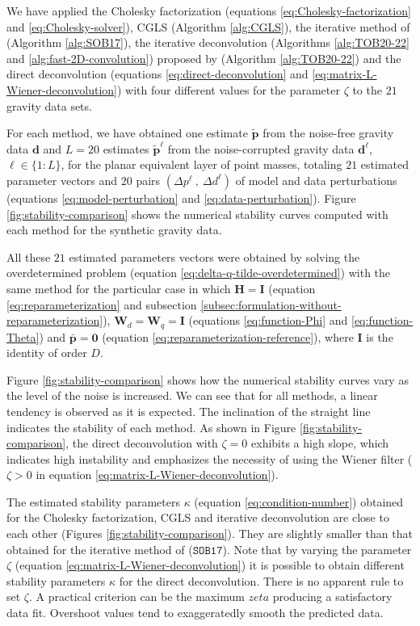 We have applied the Cholesky factorization (equations \ref{eq:Cholesky-factorization} and \ref{eq:Cholesky-solver}), 
CGLS (Algorithm \ref{alg:CGLS}), the iterative method of \citet{siqueira-etal2017} (Algorithm \ref{alg:SOB17}), 
the iterative deconvolution (Algorithms \ref{alg:TOB20-22} and \ref{alg:fast-2D-convolution}) proposed by 
\citet{takahashi-etal2020} (Algorithm \ref{alg:TOB20-22}) and the direct deconvolution 
(equations \ref{eq:direct-deconvolution} and \ref{eq:matrix-L-Wiener-deconvolution})
with four different values for the parameter $\zeta$ to the $21$ gravity data sets.

For each method, we have obtained one estimate $\tilde{\mathbf{p}}$ from the noise-free gravity data $\mathbf{d}$
and $L=20$ estimates $\tilde{\mathbf{p}}^{\ell}$ from the noise-corrupted gravity data $\mathbf{d}^{\ell}$, $\ell \in \{1:L\}$,
for the planar equivalent layer of point masses, totaling $21$ estimated parameter vectors and 
$20$ pairs $\left( \Delta p^{\ell} \: , \: \Delta d^{\ell} \right)$ of model and data perturbations
(equations \ref{eq:model-perturbation} and \ref{eq:data-perturbation}).
Figure \ref{fig:stability-comparison} shows the numerical stability curves computed with each method for 
the synthetic gravity data.

All these $21$ estimated parameters vectors were obtained by solving 
the overdetermined problem (equation \ref{eq:delta-q-tilde-overdetermined}) with the same method for the particular case in which
$\mathbf{H} = \mathbf{I}$ (equation \ref{eq:reparameterization} and 
subsection \ref{subsec:formulation-without-reparameterization}),
$\mathbf{W}_{d} = \mathbf{W}_{q} = \mathbf{I}$ (equations \ref{eq:function-Phi} and \ref{eq:function-Theta}) and
$\bar{\mathbf{p}} = \mathbf{0}$ (equation \ref{eq:reparameterization-reference}), where $\mathbf{I}$ is the identity of order $D$.

Figure \ref{fig:stability-comparison} shows how the numerical stability curves vary as the level of the noise is increased. 
We can see that for all methods, a linear tendency is observed as it is expected. The inclination of the straight line indicates the stability of each method. 
As shown in Figure \ref{fig:stability-comparison}, the direct deconvolution with $\zeta = 0$ exhibits a high slope, which indicates high instability and 
emphasizes the necessity of using the Wiener filter ($\zeta > 0$ in equation \ref{eq:matrix-L-Wiener-deconvolution}). 

The estimated stability parameters $\kappa$ (equation \ref{eq:condition-number}) obtained for the Cholesky factorization, CGLS and
iterative deconvolution are close to each other (Figures \ref{fig:stability-comparison}).
They are slightly smaller than that obtained for the iterative method of \citet{siqueira-etal2017} ($\mathtt{SOB17}$).
Note that by varying the parameter $\zeta$ (equation \ref{eq:matrix-L-Wiener-deconvolution}) it is possible to obtain different 
stability parameters $\kappa$ for the direct deconvolution. There is no apparent rule to set $\zeta$.
A practical criterion can be the maximum $zeta$ producing a satisfactory data fit. Overshoot values tend to exaggeratedly smooth the 
predicted data. 

